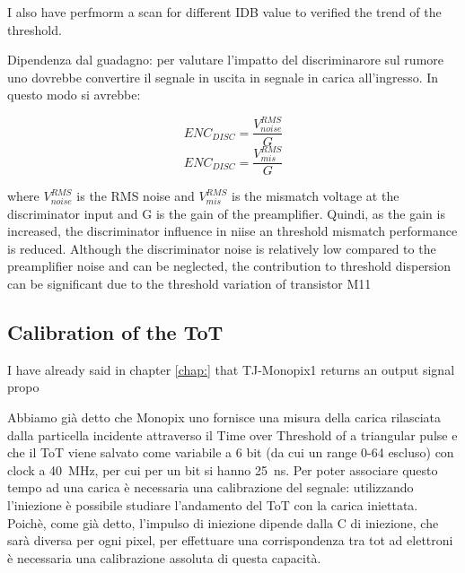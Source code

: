         I also have perfmorm a scan for different IDB value to verified the trend of the threshold. 

    Dipendenza dal guadagno: per valutare l'impatto del discriminarore sul rumore uno dovrebbe convertire il segnale in uscita in segnale in carica all'ingresso. In questo modo si avrebbe:
    \begin{multicols}{2}
        \begin{equation}
            ENC_{DISC} = \frac{V_{noise} ^ {RMS}}{G}
        \end{equation}\break
        \begin{equation}
            ENC_{DISC} = \frac{V_{mis} ^ {RMS}}{G}
        \end{equation}
        \label{eq:}
    \end{multicols}
    where $V_{noise} ^ {RMS}$ is the RMS noise and $V_{mis} ^ {RMS}$ is the mismatch voltage at the discriminator input and G is the gain of the preamplifier. 
    Quindi, as the gain is increased, the discriminator influence in niise an threshold mismatch performance is reduced. Although the discriminator noise is relatively low compared to the preamplifier noise and can be neglected, the contribution to threshold dispersion can be significant due
    to the threshold variation of transistor M11

        

    \subsection{Calibration of the ToT}    
        I have already said in chapter \ref{chap:} that TJ-Monopix1 returns an output signal propo 


        Abbiamo già detto che Monopix uno fornisce una misura della carica rilasciata dalla particella incidente attraverso il Time over Threshold of a triangular pulse e che il ToT viene salvato come variabile a 6 bit (da cui un range 0-64 escluso) con clock a \SI{40}{MHz}, per cui per un bit si hanno \SI{25}{ns}. 
        Per poter associare questo tempo ad una carica è necessaria una calibrazione del segnale: utilizzando l'iniezione è possibile studiare l'andamento del ToT con la carica iniettata. 
        Poichè, come già detto, l'impulso di iniezione dipende dalla C di iniezione, che sarà diversa per ogni pixel, per effettuare una corrispondenza tra tot ad elettroni è necessaria una calibrazione assoluta di questa capacità.

